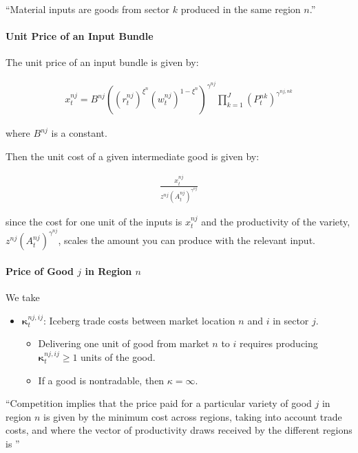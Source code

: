 \documentclass[10pt]{article}
\begin{document}
``Material inputs are goods from sector $k$
produced in the same region $n$.''

\paragraph{Unit Price of an Input Bundle}

The unit price of an input bundle is given by:

\begin{align}
    x_t^{n j}=B^{n j}\left(\left(r_t^{n j}\right)^{\xi^n}\left(w_t^{n j}\right)^{1-\xi^n}\right)^{\gamma^{n j}} \prod_{k=1}^J\left(P_t^{n k}\right)^{\gamma^{n j, n k}}
\end{align}

where $B^{n j}$ is a constant.

Then the unit cost of a given intermediate good is given by:

\begin{align}
    \frac{x_t^{n j}}{z^{n j}\left(A_t^{n j}\right)^{\gamma^{n j}}}
\end{align}

since the cost for one unit of the inputs is $x_t^{n j}$ and
the productivity of the variety, $z^{n j}\left(A_t^{n j}\right)^{\gamma^{n j}}$,
scales the amount you can produce with the relevant input.

\paragraph{Price of Good $j$ in Region $n$}

We take

\begin{itemize}
    \item $\boldsymbol{\kappa}_t^{n j, i j}$: Iceberg trade costs between market location $n$ and $i$ in 
    sector $j$.
    \begin{itemize}
        \item Delivering one unit of good from market $n$ to $i$ 
            requires producing $\boldsymbol{\kappa}_t^{n j, i j} \geq  1$ units of the good.
        \item If a good is nontradable, then $\kappa=\infty$.
    \end{itemize}
\end{itemize}

``Competition implies that the 
price paid for a particular variety of good $j$ in region $n$
is given by the minimum cost across regions, 
taking into account trade costs, 
and where the vector of productivity 
draws received by the different regions is ''
\end{document}

